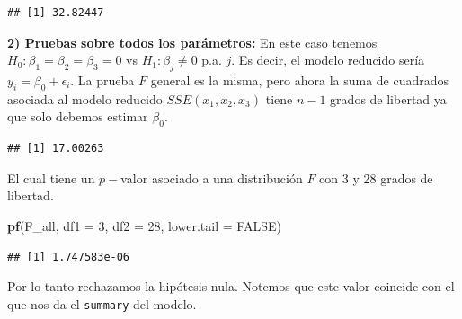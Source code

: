 \documentclass[
]{book}
\newenvironment{Shaded}{\begin{snugshade}}{\end{snugshade}}
\newcommand{\AttributeTok}[1]{\textcolor[rgb]{0.13,0.29,0.53}{#1}}
\newcommand{\ConstantTok}[1]{\textcolor[rgb]{0.56,0.35,0.01}{#1}}
\newcommand{\DecValTok}[1]{\textcolor[rgb]{0.00,0.00,0.81}{#1}}
\newcommand{\FunctionTok}[1]{\textcolor[rgb]{0.13,0.29,0.53}{\textbf{#1}}}
\newcommand{\NormalTok}[1]{#1}
\newcommand{\OtherTok}[1]{\textcolor[rgb]{0.56,0.35,0.01}{#1}}
\newcommand{\SpecialCharTok}[1]{\textcolor[rgb]{0.81,0.36,0.00}{\textbf{#1}}}
\newcommand{\StringTok}[1]{\textcolor[rgb]{0.31,0.60,0.02}{#1}}
\begin{document}
\begin{verbatim}
## [1] 32.82447
\end{verbatim}

\textbf{2) Pruebas sobre todos los parámetros:} En este caso tenemos \(H_0:\beta_1=\beta_2=\beta_3=0\) vs \(H_1: \beta_j\neq 0\) p.a. \(j\). Es decir, el modelo reducido sería \(y_i = \beta_0+\epsilon_i\). La prueba \(F\) general es la misma, pero ahora la suma de cuadrados asociada al modelo reducido \(SSE(x_1,x_2,x_3)\) tiene \(n-1\) grados de libertad ya que solo debemos estimar \(\beta_0\).

\begin{Shaded}
\end{Shaded}

\begin{verbatim}
## [1] 17.00263
\end{verbatim}

El cual tiene un \(p-\)valor asociado a una distribución \(F\) con 3 y 28 grados de libertad.

\begin{Shaded}
\begin{Highlighting}[]
\FunctionTok{pf}\NormalTok{(F\_all, }\AttributeTok{df1 =} \DecValTok{3}\NormalTok{, }\AttributeTok{df2 =} \DecValTok{28}\NormalTok{, }\AttributeTok{lower.tail =} \ConstantTok{FALSE}\NormalTok{)}
\end{Highlighting}
\end{Shaded}

\begin{verbatim}
## [1] 1.747583e-06
\end{verbatim}

Por lo tanto rechazamos la hipótesis nula. Notemos que este valor coincide con el que nos da el \texttt{summary} del modelo.
\end{document}
